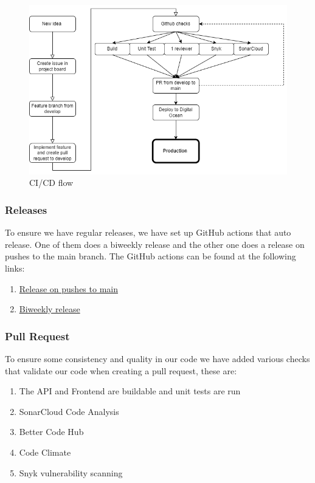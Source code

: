 \documentclass[10pt]{article}
\begin{document}
\begin{figure}[H]
    \centering
    \includegraphics[width=\textwidth]{images/flow.PNG}
    \caption{CI/CD flow}
    \label{fig:flow}
\end{figure}

\subsubsection{Releases}
To ensure we have regular releases, we have set up GitHub actions that auto release. One of them does a biweekly release and the other one does a release on pushes to the main branch. The GitHub actions can be found at the following links:
\begin{enumerate}
    \item \href{https://github.com/Arklaide/devopsITUproject/blob/main/.github/workflows/releaseonpush.yml}{Release on pushes to main}
    \item \href{https://github.com/Arklaide/devopsITUproject/blob/main/.github/workflows/autorelease.yml}{Biweekly release}
\end{enumerate}

\subsubsection{Pull Request}
To ensure some consistency and quality in our code we have added various checks that validate our code when creating a pull request, these are:
\begin{enumerate}
    \item The API and Frontend are buildable and unit tests are run
    \item SonarCloud Code Analysis
    \item Better Code Hub
    \item Code Climate
    \item Snyk vulnerability scanning
\end{enumerate}
\end{document}

